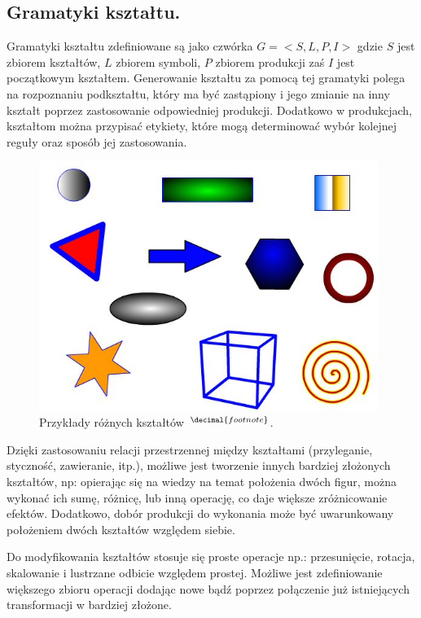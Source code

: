 \subsection{Gramatyki kształtu.}
Gramatyki kształtu zdefiniowane są jako czwórka $G=<S,L,P,I>$ gdzie $S$ jest
zbiorem kształtów, $L$ zbiorem symboli, $P$ zbiorem produkcji zaś $I$ jest
początkowym kształtem. Generowanie kształtu za pomocą tej gramatyki polega na
rozpoznaniu podkształtu, który ma być zastąpiony i jego zmianie na inny kształt
poprzez zastosowanie odpowiedniej produkcji. Dodatkowo w produkcjach, kształtom
można przypisać etykiety, które mogą determinować wybór kolejnej reguły oraz
sposób jej zastosowania.

\addtocounter{footnote}{1}
\begin{figure}[h!]
  \centering
  \includegraphics[width=11cm]{images/shapes.jpg}
  \caption[Przykłady różnych kształtów.]{Przykłady różnych
  kształtów~$^{\decimal{footnote}}$.}
  \label{shapes01}
\end{figure}


Dzięki zastosowaniu relacji przestrzennej między kształtami (przyleganie,
styczność, zawieranie, itp.), możliwe jest tworzenie innych bardziej złożonych
kształtów, np: opierając się na wiedzy na temat położenia dwóch figur, można
wykonać ich sumę, różnicę, lub inną operację, co daje większe zróżnicowanie
efektów. Dodatkowo, dobór produkcji do wykonania może być uwarunkowany
położeniem dwóch kształtów względem siebie.


Do modyfikowania kształtów stosuje się proste operacje np.: przesunięcie,
rotacja, skalowanie i lustrzane odbicie względem prostej. Możliwe jest
zdefiniowanie większego zbioru operacji dodając nowe bądź poprzez połączenie już
istniejących transformacji w bardziej złożone.


